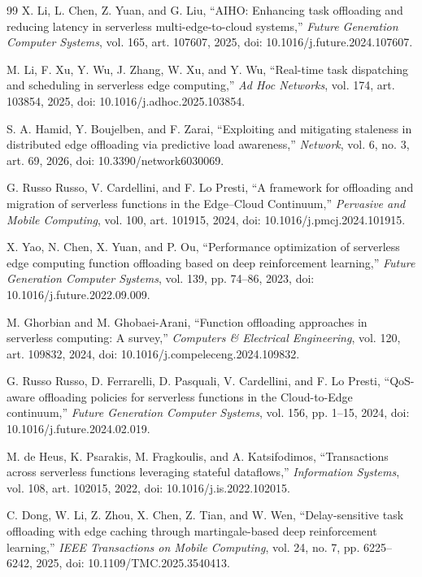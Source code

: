 \documentclass[conference]{IEEEtran}
\begin{document}
\begin{thebibliography}{99}
 X. Li, L. Chen, Z. Yuan, and G. Liu, ``AIHO: Enhancing task offloading and reducing latency in serverless multi-edge-to-cloud systems,'' \emph{Future Generation Computer Systems}, vol. 165, art. 107607, 2025, doi: 10.1016/j.future.2024.107607.

 M. Li, F. Xu, Y. Wu, J. Zhang, W. Xu, and Y. Wu, ``Real-time task dispatching and scheduling in serverless edge computing,'' \emph{Ad Hoc Networks}, vol. 174, art. 103854, 2025, doi: 10.1016/j.adhoc.2025.103854.

 S. A. Hamid, Y. Boujelben, and F. Zarai, ``Exploiting and mitigating staleness in distributed edge offloading via predictive load awareness,'' \emph{Network}, vol. 6, no. 3, art. 69, 2026, doi: 10.3390/network6030069.

 G. Russo Russo, V. Cardellini, and F. Lo Presti, ``A framework for offloading and migration of serverless functions in the Edge--Cloud Continuum,'' \emph{Pervasive and Mobile Computing}, vol. 100, art. 101915, 2024, doi: 10.1016/j.pmcj.2024.101915.

 X. Yao, N. Chen, X. Yuan, and P. Ou, ``Performance optimization of serverless edge computing function offloading based on deep reinforcement learning,'' \emph{Future Generation Computer Systems}, vol. 139, pp. 74--86, 2023, doi: 10.1016/j.future.2022.09.009.

 M. Ghorbian and M. Ghobaei-Arani, ``Function offloading approaches in serverless computing: A survey,'' \emph{Computers \& Electrical Engineering}, vol. 120, art. 109832, 2024, doi: 10.1016/j.compeleceng.2024.109832.

 G. Russo Russo, D. Ferrarelli, D. Pasquali, V. Cardellini, and F. Lo Presti, ``QoS-aware offloading policies for serverless functions in the Cloud-to-Edge continuum,'' \emph{Future Generation Computer Systems}, vol. 156, pp. 1--15, 2024, doi: 10.1016/j.future.2024.02.019.

 M. de Heus, K. Psarakis, M. Fragkoulis, and A. Katsifodimos, ``Transactions across serverless functions leveraging stateful dataflows,'' \emph{Information Systems}, vol. 108, art. 102015, 2022, doi: 10.1016/j.is.2022.102015.

 C. Dong, W. Li, Z. Zhou, X. Chen, Z. Tian, and W. Wen, ``Delay-sensitive task offloading with edge caching through martingale-based deep reinforcement learning,'' \emph{IEEE Transactions on Mobile Computing}, vol. 24, no. 7, pp. 6225--6242, 2025, doi: 10.1109/TMC.2025.3540413.


\end{thebibliography}
\end{document}
